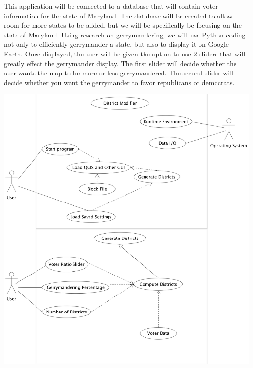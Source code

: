 \documentclass{article}
\begin{document}
\begin{addmargin}[4em]{0em}

This application will be connected to a database that will contain voter information for the state of Maryland. The database will be created to allow room for more states to be added, but we will be specifically be focusing on the state of Maryland. Using research on gerrymandering, we will use Python coding not only to efficiently gerrymander a state, but also to display it on Google Earth. Once displayed, the user will be given the option to use 2 sliders that will greatly effect the gerrymander display. The first slider will decide whether the user wants the map to be more or less gerrymandered. The second slider will decide whether you want the gerrymander to favor republicans or democrats. 

\end{addmargin}

\begin{center}
\hspace*{-2cm}      
\includegraphics[scale=.15]{Program.png}
\end{center}

\vspace{2.5mm}
\end{document}
